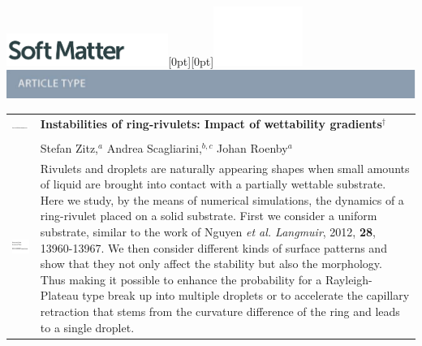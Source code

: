 \documentclass[twoside,twocolumn,9pt]{article}
\begin{document}
  \begin{@twocolumnfalse}
{\includegraphics[height=30pt]{head_foot/SM}\hfill\raisebox{0pt}[0pt][0pt]{\includegraphics[height=55pt]{head_foot/RSC_LOGO_CMYK}}\\[1ex]
\includegraphics[width=18.5cm]{head_foot/header_bar}}\par
\vspace{1em}
\sffamily
\begin{tabular}{m{4.5cm} p{13.5cm} }

\includegraphics{head_foot/DOI} & \noindent\LARGE{\textbf{Instabilities of ring-rivulets: Impact of wettability gradients$^\dag$}} \\%
\vspace{0.3cm} & \vspace{0.3cm} \\

 & \noindent\large{Stefan Zitz,\textit{$^{a}$} Andrea Scagliarini,\textit{$^{b,c}$} Johan Roenby\textit{$^{a}$}} \\%

\includegraphics{head_foot/dates} & \noindent\normalsize{
Rivulets and droplets are naturally appearing shapes when small amounts of liquid are brought into contact with a partially wettable substrate.
Here we study, by the means of numerical simulations, the dynamics of a ring-rivulet placed on a solid substrate.
First we consider a uniform substrate, similar to the work of Nguyen \textit{et al. Langmuir}, 2012, \textbf{28}, 13960-13967.
We then consider different kinds of surface patterns and show that they not only affect the stability but also the morphology.
Thus making it possible to enhance the probability for a Rayleigh-Plateau type break up into multiple droplets or to accelerate the capillary retraction that stems from the curvature difference of the ring and leads to a single droplet.
}

\end{tabular}

 \end{@twocolumnfalse} \vspace{0.6cm}
\end{document}
